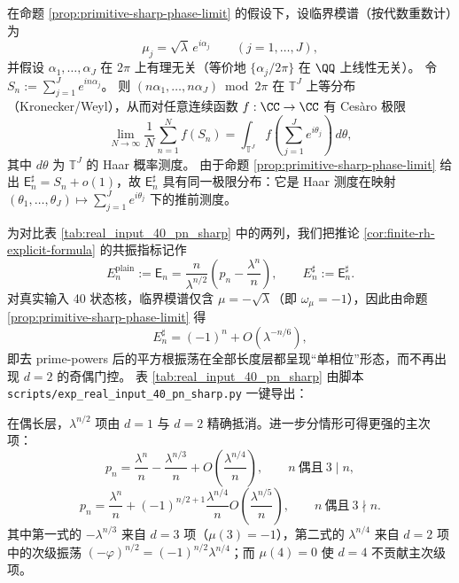 \begin{remark}\label{rem:primitive-sharp-limit-law}
在命题 \ref{prop:primitive-sharp-phase-limit} 的假设下，设临界模谱（按代数重数计）为
\[
\mu_j=\sqrt{\lambda}\,e^{i\alpha_j}\qquad(j=1,\dots,J),
\]
并假设 \(\alpha_1,\dots,\alpha_J\) 在 \(2\pi\) 上有理无关（等价地 \(\{\alpha_j/2\pi\}\) 在 \(\QQ\) 上线性无关）。
令
\(
S_n:=\sum_{j=1}^{J}e^{in\alpha_j}
\)。
则 \((n\alpha_1,\dots,n\alpha_J)\bmod 2\pi\) 在 \(\mathbb{T}^J\) 上等分布（Kronecker/Weyl），从而对任意连续函数 \(f:\CC\to\CC\) 有 Ces\`aro 极限
\[
\lim_{N\to\infty}\frac{1}{N}\sum_{n=1}^{N} f(S_n)
=\int_{\mathbb{T}^J} f\!\left(\sum_{j=1}^{J}e^{i\theta_j}\right)\,d\theta,
\]
其中 \(d\theta\) 为 \(\mathbb{T}^J\) 的 Haar 概率测度。
由于命题 \ref{prop:primitive-sharp-phase-limit} 给出 \(\mathsf{E}_n^\sharp=S_n+o(1)\)，故 \(\mathsf{E}_n^\sharp\) 具有同一极限分布：它是 Haar 测度在映射 \((\theta_1,\dots,\theta_J)\mapsto\sum_{j=1}^{J}e^{i\theta_j}\) 下的推前测度。
\end{remark}

\begin{remark}\label{rem:real-input-40-pn-sharp}
为对比表 \ref{tab:real_input_40_pn_sharp} 中的两列，我们把推论 \ref{cor:finite-rh-explicit-formula} 的共振指标记作
\[
E_n^{\mathrm{plain}}
:=\mathsf{E}_n
=\frac{n}{\lambda^{n/2}}\left(p_n-\frac{\lambda^n}{n}\right),
\qquad
E_n^{\sharp}:=\mathsf{E}_n^\sharp.
\]
对真实输入 40 状态核，临界模谱仅含 \(\mu=-\sqrt{\lambda}\)（即 \(\omega_\mu=-1\)），因此由命题 \ref{prop:primitive-sharp-phase-limit} 得
\[
E_n^{\sharp}=(-1)^n+O(\lambda^{-n/6}),
\]
即去 prime-powers 后的平方根振荡在全部长度层都呈现“单相位”形态，而不再出现 \(d=2\) 的奇偶门控。
表 \ref{tab:real_input_40_pn_sharp} 由脚本 \texttt{scripts/exp\_real\_input\_40\_pn\_sharp.py} 一键导出：

\end{remark}

\begin{remark}\label{rem:finite-rh-even-strengthen}
在偶长层，$\lambda^{n/2}$ 项由 $d=1$ 与 $d=2$ 精确抵消。进一步分情形可得更强的主次项：
\[
p_n=\frac{\lambda^n}{n}-\frac{\lambda^{n/3}}{n}+O\!\left(\frac{\lambda^{n/4}}{n}\right),
\qquad n\ \text{偶且}\ 3\mid n,
\]
\[
p_n=\frac{\lambda^n}{n}+(-1)^{n/2+1}\frac{\lambda^{n/4}}{n}
O\!\left(\frac{\lambda^{n/5}}{n}\right),
\qquad n\ \text{偶且}\ 3\nmid n.
\]
其中第一式的 $-\lambda^{n/3}$ 来自 $d=3$ 项（$\mu(3)=-1$），第二式的 $\lambda^{n/4}$ 来自 $d=2$ 项中的次级振荡
$(-\varphi)^{n/2}=(-1)^{n/2}\lambda^{n/4}$；而 $\mu(4)=0$ 使 $d=4$ 不贡献主次级项。
\end{remark}

